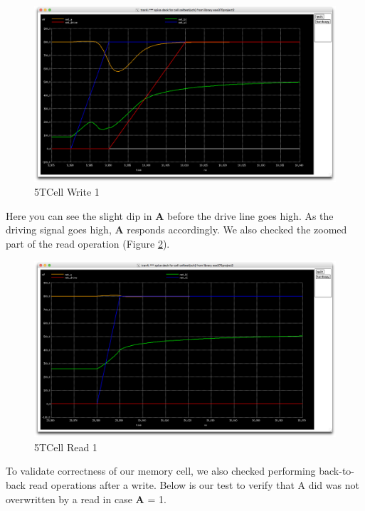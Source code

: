 \documentclass[a4paper]{article}
\begin{document}
 \begin{figure}[H]
	\centering
	\includegraphics[scale=0.12]{5TWrite1}
	\caption{5TCell Write 1}
	\label{fig:5TWrite1}
\end{figure}

Here you can see the slight dip in \textbf{A} before the drive line goes high. As the driving signal goes high, \textbf{A} responds accordingly. We also checked the zoomed part of the read operation (Figure \ref{fig:5TRead1}).

 \begin{figure}[H]
	\centering
	\includegraphics[scale=0.12]{5TRead1}
	\caption{5TCell Read 1}
	\label{fig:5TRead1}
\end{figure}

To validate correctness of our memory cell, we also checked performing back-to-back read operations after a write. Below is our test to verify that A did was not overwritten by a read in case \textbf{A} = 1.
\end{document}
